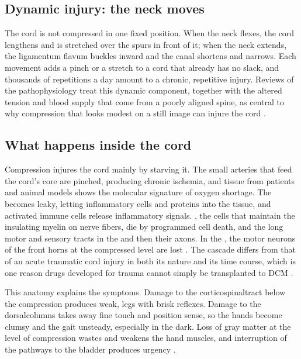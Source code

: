 \documentclass[11pt, letterpaper]{article}
\begin{document}
\subsection*{Dynamic injury: the neck moves}

The cord is not compressed in one fixed position. When the neck flexes, the cord lengthens and is stretched over the spurs in front of it; when the neck extends, the ligamentum flavum buckles inward and the canal shortens and narrows. Each movement adds a pinch or a stretch to a cord that already has no slack, and thousands of repetitions a day amount to a chronic, repetitive injury. Reviews of the pathophysiology treat this dynamic component, together with the altered tension and blood supply that come from a poorly aligned spine, as central to why compression that looks modest on a still image can injure the cord \citep{karadimas2013,nouri2015}.

\subsection*{What happens inside the cord}

Compression injures the cord mainly by starving it. The small arteries that feed the cord's core are pinched, producing chronic \gls{ischemia}, and tissue from patients and animal models shows the molecular signature of oxygen shortage. The  becomes leaky, letting inflammatory cells and proteins into the tissue, and activated immune cells release inflammatory signals. , the cells that maintain the insulating myelin on nerve fibers, die by programmed cell death, and the long motor and sensory tracts in the   and then their axons. In the , the motor neurons of the front horns at the compressed level are lost \citep{akter2020,yu2011}. The cascade differs from that of an acute traumatic cord injury in both its nature and its time course, which is one reason drugs developed for trauma cannot simply be transplanted to DCM \citep{karadimas2013}.

This anatomy explains the symptoms. Damage to the \gls{corticospinaltract} below the compression produces weak,  legs with brisk reflexes. Damage to the \gls{dorsalcolumns} takes away fine touch and position sense, so the hands become clumsy and the gait unsteady, especially in the dark. Loss of gray matter at the level of compression wastes and weakens the hand muscles, and interruption of the pathways to the bladder produces urgency \citep{akter2020,tetreault2022}.
\end{document}
